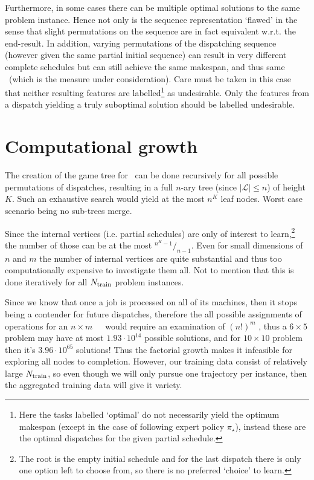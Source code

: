 Furthermore, in some cases there can be multiple optimal solutions to the same 
problem instance. 
Hence not only is the sequence representation `flawed' in the sense that slight 
permutations on the sequence are in fact equivalent w.r.t. the end-result.
In addition, varying permutations of the dispatching sequence (however given 
the same partial initial sequence) can result in very different complete 
schedules but can still achieve the same makespan, and thus same \fullnamerho\ 
(which is the measure under consideration). 
Care must be taken in this case that neither resulting features are 
labelled\footnote{Here the tasks labelled `optimal' do not necessarily yield the
  optimum makespan (except in the case of following expert policy $\pi_\star$), 
  instead these are the optimal dispatches for the given partial schedule.} 
as undesirable. 
Only the features from a dispatch yielding a truly suboptimal solution should 
be labelled undesirable. 

\section{Computational growth}
The creation of the game tree for \JSP\ can be done recursively for all 
possible permutations of dispatches, resulting in a full \mbox{$n$-ary} tree 
(since $|\mathcal{L}|\leq n$) of height $K$. 
Such an exhaustive search would yield at the most $n^K$ leaf nodes. Worst case 
scenario being no sub-trees merge.

\noindent Since the internal vertices (i.e. partial schedules) are only of 
interest to learn,\footnote{The root is the empty initial schedule and for the
  last dispatch there is only one option left to choose from, so there is no 
  preferred `choice' to learn.} 
the number of those can be at the most \mbox{${}^{n^K-1}/_{n-1}$}.
Even for small dimensions of $n$ and $m$ the number of internal vertices are 
quite substantial and thus too computationally expensive to investigate them 
all. Not to mention that this is done iteratively for all $N_{\text{train}}$ 
problem instances.

Since we know that once a job is processed on all of its machines, then it 
stops being a contender for future dispatches, therefore the all possible 
assignments of operations for an $n\times m$~~\JSP\ would require an 
examination of $(n!)^m$ \citep{Giffler60}, thus a $6\times5$ problem may have 
at most $1.93\cdot10^{14}$ possible solutions, and for $10\times10$ problem 
then it's $3.96\cdot10^{65}$ solutions! Thus the factorial growth makes it 
infeasible for exploring all nodes to completion. However, our training data 
consist of relatively large $N_{\text{train}}$, so even though we will only 
pursue one trajectory per instance, then the aggregated training data will give 
it variety.

